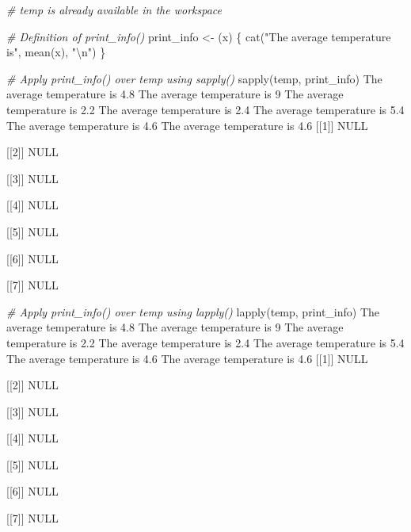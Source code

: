 \documentclass[]{article}
\newcommand{\hlnum}[1]{\textcolor[rgb]{0.816,0.125,0.439}{#1}}%
\newcommand{\hlstr}[1]{\textcolor[rgb]{0.251,0.627,0.251}{#1}}%
\newcommand{\hlcom}[1]{\textcolor[rgb]{0.502,0.502,0.502}{\textit{#1}}}%
\newcommand{\hlstd}[1]{\textcolor[rgb]{0.251,0.251,0.251}{#1}}%
\newcommand{\hlkwd}[1]{\textcolor[rgb]{0.878,0.439,0.125}{#1}}%
\newenvironment{Shaded}{\begin{myshaded}}{\end{myshaded}}
\newcommand{\KeywordTok}[1]{\hlkwd{#1}}
\newcommand{\DecValTok}[1]{\hlnum{#1}}
\newcommand{\FloatTok}[1]{\hlnum{#1}}
\newcommand{\CharTok}[1]{\hlstr{#1}}
\newcommand{\StringTok}[1]{\hlstr{#1}}
\newcommand{\CommentTok}[1]{\hlcom{#1}}
\newcommand{\OtherTok}[1]{{#1}}
\newcommand{\NormalTok}[1]{\hlstd{#1}}
\begin{document}
\begin{Shaded}
\begin{Highlighting}[]
\CommentTok{# temp is already available in the workspace}

\CommentTok{# Definition of print_info()}
\NormalTok{print_info <-}\StringTok{ }\NormalTok{(x) \{}
  \KeywordTok{cat}\NormalTok{(}\StringTok{"The average temperature is"}\NormalTok{, }\KeywordTok{mean}\NormalTok{(x), }\StringTok{"}\CharTok{\textbackslash{}n}\StringTok{"}\NormalTok{)}
\NormalTok{\}}

\CommentTok{# Apply print_info() over temp using sapply()}
\KeywordTok{sapply}\NormalTok{(temp, print_info)}
\NormalTok{   The average temperature is }\FloatTok{4.8} 
\NormalTok{   The average temperature is }\DecValTok{9} 
\NormalTok{   The average temperature is }\FloatTok{2.2} 
\NormalTok{   The average temperature is }\FloatTok{2.4} 
\NormalTok{   The average temperature is }\FloatTok{5.4} 
\NormalTok{   The average temperature is }\FloatTok{4.6} 
\NormalTok{   The average temperature is }\FloatTok{4.6}
\NormalTok{   [[}\DecValTok{1}\NormalTok{]]}
   \OtherTok{NULL}
   
\NormalTok{   [[}\DecValTok{2}\NormalTok{]]}
   \OtherTok{NULL}
   
\NormalTok{   [[}\DecValTok{3}\NormalTok{]]}
   \OtherTok{NULL}
   
\NormalTok{   [[}\DecValTok{4}\NormalTok{]]}
   \OtherTok{NULL}
   
\NormalTok{   [[}\DecValTok{5}\NormalTok{]]}
   \OtherTok{NULL}
   
\NormalTok{   [[}\DecValTok{6}\NormalTok{]]}
   \OtherTok{NULL}
   
\NormalTok{   [[}\DecValTok{7}\NormalTok{]]}
   \OtherTok{NULL}

\CommentTok{# Apply print_info() over temp using lapply()}
\KeywordTok{lapply}\NormalTok{(temp, print_info)}
\NormalTok{   The average temperature is }\FloatTok{4.8} 
\NormalTok{   The average temperature is }\DecValTok{9} 
\NormalTok{   The average temperature is }\FloatTok{2.2} 
\NormalTok{   The average temperature is }\FloatTok{2.4} 
\NormalTok{   The average temperature is }\FloatTok{5.4} 
\NormalTok{   The average temperature is }\FloatTok{4.6} 
\NormalTok{   The average temperature is }\FloatTok{4.6}
\NormalTok{   [[}\DecValTok{1}\NormalTok{]]}
   \OtherTok{NULL}
   
\NormalTok{   [[}\DecValTok{2}\NormalTok{]]}
   \OtherTok{NULL}
   
\NormalTok{   [[}\DecValTok{3}\NormalTok{]]}
   \OtherTok{NULL}
   
\NormalTok{   [[}\DecValTok{4}\NormalTok{]]}
   \OtherTok{NULL}
   
\NormalTok{   [[}\DecValTok{5}\NormalTok{]]}
   \OtherTok{NULL}
   
\NormalTok{   [[}\DecValTok{6}\NormalTok{]]}
   \OtherTok{NULL}
   
\NormalTok{   [[}\DecValTok{7}\NormalTok{]]}
   \OtherTok{NULL}
\end{Highlighting}
\end{Shaded}
\end{document}
